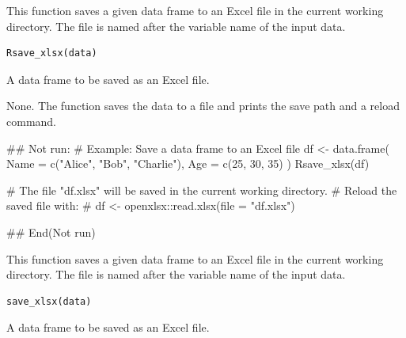\documentclass[a4paper]{book}
\begin{document}
%
\begin{Description}
This function saves a given data frame to an Excel file in the current working directory.
The file is named after the variable name of the input data.
\end{Description}
%
\begin{Usage}
\begin{verbatim}
Rsave_xlsx(data)
\end{verbatim}
\end{Usage}
%
\begin{Arguments}
\begin{ldescription}
\item[\code{data}] A data frame to be saved as an Excel file.
\end{ldescription}
\end{Arguments}
%
\begin{Value}
None. The function saves the data to a file and prints the save path and a reload command.
\end{Value}
%
\begin{Examples}
\begin{ExampleCode}
\#\# Not run: 
# Example: Save a data frame to an Excel file
df <- data.frame(
  Name = c("Alice", "Bob", "Charlie"),
  Age = c(25, 30, 35)
)
Rsave_xlsx(df)

# The file "df.xlsx" will be saved in the current working directory.
# Reload the saved file with:
# df <- openxlsx::read.xlsx(file = "df.xlsx")

## End(Not run)
\end{ExampleCode}
\end{Examples}
%
\begin{Description}
This function saves a given data frame to an Excel file in the current working directory.
The file is named after the variable name of the input data.
\end{Description}
%
\begin{Usage}
\begin{verbatim}
save_xlsx(data)
\end{verbatim}
\end{Usage}
%
\begin{Arguments}
\begin{ldescription}
\item[\code{data}] A data frame to be saved as an Excel file.
\end{ldescription}
\end{Arguments}
\end{document}
